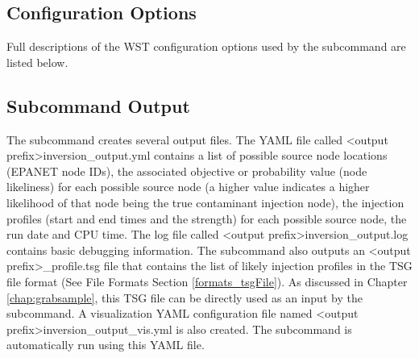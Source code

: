 \subsection{Configuration Options}\label{sec.inversion_subcommand.config_options}

Full descriptions of the WST configuration options used by the  subcommand are listed below.


\subsection{Subcommand Output}

The  subcommand creates several output files. 
The YAML file called <output prefix>inversion\_output.yml 
contains a list of possible source node locations (EPANET node IDs),  
the associated objective or probability value (node likeliness) for each possible source node 
(a higher value indicates a higher likelihood of that node being 
the true contaminant injection node), the injection profiles (start 
and end times and the strength) for each possible source node, 
the run date and CPU time. 
The log file called <output prefix>inversion\_output.log contains basic debugging information. 
The  subcommand also outputs an 
<output prefix>\_profile.tsg file that contains the list of likely 
injection profiles in the TSG file format (See File Formats 
Section \ref{formats_tsgFile}). As discussed in Chapter \ref{chap:grabsample}, this TSG
file can be directly used as an input by the  
subcommand.
A visualization YAML configuration file named <output prefix>inversion\_output\_vis.yml is also created.
The  subcommand is automatically run using this YAML file.

